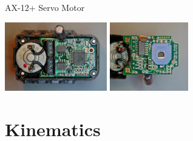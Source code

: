 \documentclass[compress]{beamer}
\begin{document}
\begin{frame}{AX-12+ Servo Motor}
{    \begin{center}
        \includegraphics[height=3cm]{image29}
        \hspace{1em}
        \includegraphics[height=3cm]{image30}
    \end{center}
}
\end{frame}

\section{Kinematics}
\end{document}
